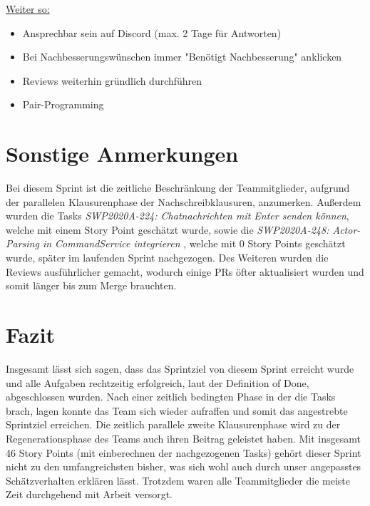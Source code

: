 \documentclass[12pt,a4paper, oneside]{article}
\begin{document}
    \underline{Weiter so:}
    \begin{itemize}
        \item Ansprechbar sein auf Discord (max. 2 Tage für Antworten)
        \item Bei Nachbesserungswünschen immer "Benötigt Nachbesserung" anklicken
        \item Reviews weiterhin gründlich durchführen
        \item Pair-Programming
    \end{itemize}

    \newpage


    \section{Sonstige Anmerkungen}

    Bei diesem Sprint ist die zeitliche Beschränkung der Teammitglieder, aufgrund der parallelen Klausurenphase der Nachschreibklausuren, anzumerken.
    Außerdem wurden die Tasks \textit{SWP2020A-224: Chatnachrichten mit Enter senden können}, welche mit einem Story Point geschätzt wurde, sowie die \textit{SWP2020A-248: Actor-Parsing in CommandService integrieren} , welche mit 0 Story Points geschätzt wurde, später im laufenden Sprint nachgezogen.
    Des Weiteren wurden die Reviews ausführlicher gemacht, wodurch einige PRs öfter aktualisiert wurden und somit länger
    bis zum Merge brauchten.


    \section{Fazit}
    Insgesamt lässt sich sagen, dass das Sprintziel von diesem Sprint erreicht wurde und alle Aufgaben rechtzeitig erfolgreich, laut der Definition of Done, abgeschlossen wurden.
    Nach einer zeitlich bedingten Phase in der die Tasks brach, lagen konnte das Team sich wieder aufraffen und somit das angestrebte Sprintziel erreichen.
    Die zeitlich parallele zweite Klausurenphase wird zu der Regenerationsphase des Teams auch ihren Beitrag geleistet haben.
    Mit insgesamt 46 Story Points (mit einberechnen der nachgezogenen Tasks) gehört dieser Sprint nicht zu den umfangreichsten bisher, was sich wohl auch durch unser angepasstes Schätzverhalten erklären lässt.
    Trotzdem waren alle Teammitglieder die meiste Zeit durchgehend mit Arbeit versorgt.
\end{document}
